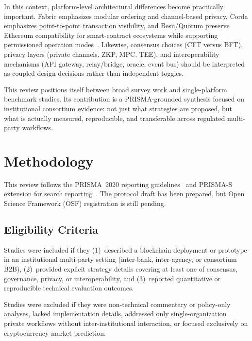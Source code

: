 \documentclass[journal]{IEEEtran}
\begin{document}
In this context, platform-level architectural differences become practically important.
Fabric emphasizes modular ordering and channel-based privacy, Corda emphasizes point-to-point transaction visibility, and Besu/Quorum preserve Ethereum compatibility for smart-contract ecosystems while supporting permissioned operation modes~\cite{androulaki2018hyperledger,brown2016corda,baliga2018performance,hyperledger2018arch}.
Likewise, consensus choices (CFT versus BFT), privacy layers (private channels, ZKP, MPC, TEE), and interoperability mechanisms (API gateway, relay/bridge, oracle, event bus) should be interpreted as coupled design decisions rather than independent toggles.

This review positions itself between broad survey work and single-platform benchmark studies.
Its contribution is a PRISMA-grounded synthesis focused on institutional consortium evidence: not just what strategies are proposed, but what is actually measured, reproducible, and transferable across regulated multi-party workflows.

\section{Methodology}
\label{sec:method}

This review follows the PRISMA~2020 reporting guidelines~\cite{page2021prisma} and PRISMA-S extension for search reporting~\cite{rethlefsen2021prismas}.
The protocol draft has been prepared, but Open Science Framework (OSF) registration is still pending.

\subsection{Eligibility Criteria}

Studies were included if they (1)~described a blockchain deployment or prototype in an institutional multi-party setting (inter-bank, inter-agency, or consortium B2B), (2)~provided explicit strategy details covering at least one of consensus, governance, privacy, or interoperability, and (3)~reported quantitative or reproducible technical evaluation outcomes.

Studies were excluded if they were non-technical commentary or policy-only analyses, lacked implementation details, addressed only single-organization private workflows without inter-institutional interaction, or focused exclusively on cryptocurrency market prediction.
\end{document}

